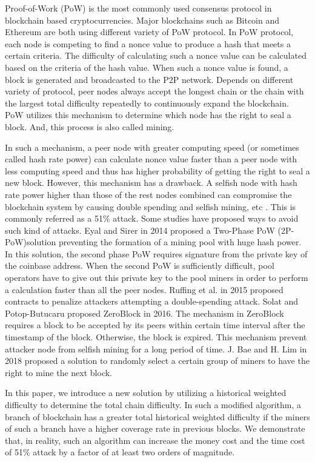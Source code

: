\documentclass[conference]{IEEEtran}
\begin{document}
Proof-of-Work (PoW) is the most commonly used consensus protocol in blockchain based cryptocurrencies. Major blockchains such as Bitcoin and Ethereum are both using different variety of PoW protocol. In PoW protocol, each node is competing to find a nonce value to produce a hash that meets a certain criteria. The difficulty of calculating such a nonce value can be calculated based on the criteria of the hash value. When such a nonce value is found, a block is generated and broadcasted to the P2P network. Depends on different variety of protocol, peer nodes always accept the longest chain or the chain with the largest total difficulty repeatedly to continuously expand the blockchain. PoW utilizes this mechanism to determine which node has the right to seal a block. And, this process is also called mining.

In such a mechanism, a peer node with greater computing speed (or sometimes called hash rate power) can calculate nonce value faster than a peer node with less computing speed and thus has higher probability of getting the right to seal a new block. However, this mechanism has a drawback. A selfish node with hash rate power higher than those of the rest nodes combined can compromise the blockchain system by causing double spending and selfish mining, etc \cite{b3}\cite{b4}. This is commonly referred as a 51\% attack. Some studies have proposed ways to avoid such kind of attacks. Eyal and Sirer \cite{b5} in 2014 proposed a Two-Phase PoW (2P-PoW)solution preventing the formation of a mining pool with huge hash power. In this solution, the second phase PoW requires signature from the private key of the coinbase address. When the second PoW is sufficiently difficult, pool operators have to give out this private key to the pool miners in order to perform a calculation faster than all the peer nodes. Ruffing et al. \cite{b6} in 2015 proposed contracts to penalize attackers attempting a double-spending attack. Solat and Potop-Butucaru proposed ZeroBlock \cite{b7} in 2016. The mechanism in ZeroBlock requires a block to be accepted by its peers within certain time interval after the timestamp of the block. Otherwise, the block is expired. This mechanism prevent attacker node from selfish mining for a long period of time. J. Bae and H. Lim \cite{b8} in 2018 proposed a solution to randomly select a certain group of miners to have the right to mine the next block.

In this paper, we introduce a new solution by utilizing a historical weighted difficulty to determine the total chain difficulty. In such a modified algorithm, a branch of blockchain has a greater total historical weighted difficulty if the miners of such a branch have a higher coverage rate in previous blocks. We demonstrate that, in reality, such an algorithm can increase the money cost and the time cost of 51\% attack by a factor of at least two orders of magnitude.
\end{document}
